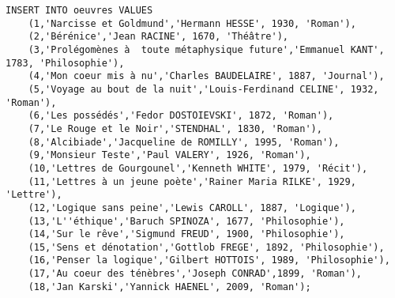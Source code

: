 \documentclass[11]{article}
\begin{document}
\begin{verbatim}
INSERT INTO oeuvres VALUES 
	(1,'Narcisse et Goldmund','Hermann HESSE', 1930, 'Roman'),
	(2,'Bérénice','Jean RACINE', 1670, 'Théâtre'),
	(3,'Prolégomènes à  toute métaphysique future','Emmanuel KANT', 1783, 'Philosophie'),
	(4,'Mon coeur mis à nu','Charles BAUDELAIRE', 1887, 'Journal'),
	(5,'Voyage au bout de la nuit','Louis-Ferdinand CELINE', 1932, 'Roman'),
	(6,'Les possédés','Fedor DOSTOIEVSKI', 1872, 'Roman'),
	(7,'Le Rouge et le Noir','STENDHAL', 1830, 'Roman'),
	(8,'Alcibiade','Jacqueline de ROMILLY', 1995, 'Roman'),
	(9,'Monsieur Teste','Paul VALERY', 1926, 'Roman'),
	(10,'Lettres de Gourgounel','Kenneth WHITE', 1979, 'Récit'),
	(11,'Lettres à un jeune poète','Rainer Maria RILKE', 1929, 'Lettre'),
	(12,'Logique sans peine','Lewis CAROLL', 1887, 'Logique'),
	(13,'L''éthique','Baruch SPINOZA', 1677, 'Philosophie'),
	(14,'Sur le rêve','Sigmund FREUD', 1900, 'Philosophie'),
	(15,'Sens et dénotation','Gottlob FREGE', 1892, 'Philosophie'),
	(16,'Penser la logique','Gilbert HOTTOIS', 1989, 'Philosophie'),
	(17,'Au coeur des ténèbres','Joseph CONRAD',1899, 'Roman'),
	(18,'Jan Karski','Yannick HAENEL', 2009, 'Roman');	
\end{verbatim}
\end{document}
